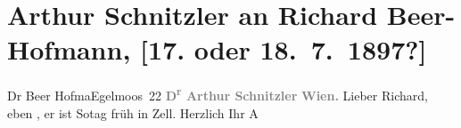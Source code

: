 

         
         \renewcommand{\erwaehntePersonen}{Personen: Richard Beer-Hofmann, Hugo von Hofmannsthal}
         \renewcommand{\erwaehnteOrte}{Orte: Bad Ischl, Eglmoosgasse, Wien, Zell am See}
         \renewcommand{\erwaehnteWerke}{}
               \section[Arthur Schnitzler an Richard Beer-Hofmann, {[}17. oder 18. 7. 1897?{]}]{ Arthur Schnitzler an Richard Beer-Hofmann, {[}17. oder
               18. 7. 1897?{]}}\nopagebreak{}\rehead{ }\begin{ledgroupsized}[t]{13cm}\normalsize\beginnumbering \toendnotes[C]{\smallbreak\pagebreak[2]} 
\toendnotes[C]{\smallbreak}\pstart{}{\pb}Dr Beer Hofma{\geminationn}\pend{}\pstart{}Egelmoos 22\pend{}{\bigskip}\pstart
           \noindent{}\centering{}{\pb}\textcolor{gray}{\textbf{D\textsuperscript{r} Arthur Schnitzler}}\pend
           \pstart
           \noindent{}\raggedleft{}\textcolor{gray}{\textbf{Wien.}}\pend
           \pstart
           \noindent{}{\pb}Lieber Richard, eben \label{K_L00704-1v}\label{K_L00704-1h}, er
               ist So{\geminationn}tag früh in Zell.\pend
           \pstart Herzlich Ihr \spacefill\mbox{A}\pend{}
         
         \endnumbering{}\end{ledgroupsized}  \newcommand{\dateiname}{L00704}\newcommand{\titel}{Arthur Schnitzler an Richard Beer-Hofmann, [17. oder 18. 7. 1897?]}\newcommand{\editorInnen}{Martin Anton Müller und Gerd-Hermann Susen}
      